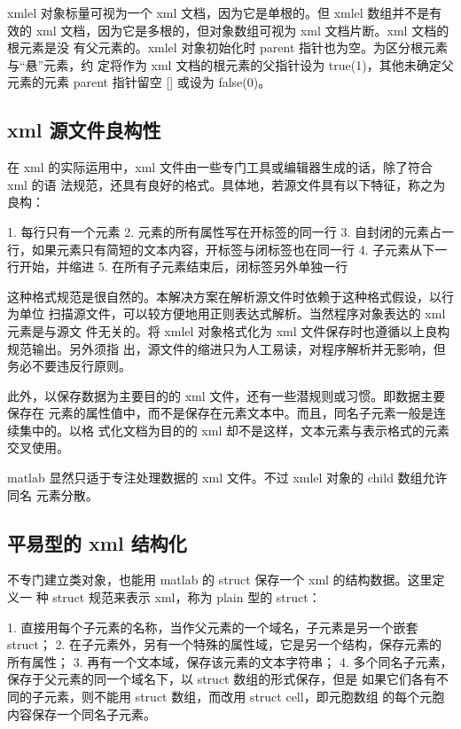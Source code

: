 xmlel 对象标量可视为一个 xml 文档，因为它是单根的。但 xmlel 数组并不是有效的
xml 文档，因为它是多根的，但对象数组可视为 xml 文档片断。xml 文档的根元素是没
有父元素的。xmlel 对象初始化时 parent 指针也为空。为区分根元素与“悬”元素，约
定将作为 xml 文档的根元素的父指针设为 true(1)，其他未确定父元素的元素 parent
指针留空 [] 或设为 false(0)。

\subsection{xml 源文件良构性}

在 xml 的实际运用中，xml 文件由一些专门工具或编辑器生成的话，除了符合 xml 的语
法规范，还具有良好的格式。具体地，若源文件具有以下特征，称之为良构：

1. 每行只有一个元素
2. 元素的所有属性写在开标签的同一行
3. 自封闭的元素占一行，如果元素只有简短的文本内容，开标签与闭标签也在同一行
4. 子元素从下一行开始，并缩进
5. 在所有子元素结束后，闭标签另外单独一行

这种格式规范是很自然的。本解决方案在解析源文件时依赖于这种格式假设，以行为单位
扫描源文件，可以较方便地用正则表达式解析。当然程序对象表达的 xml 元素是与源文
件无关的。将 xmlel 对象格式化为 xml 文件保存时也遵循以上良构规范输出。另外须指
出，源文件的缩进只为人工易读，对程序解析并无影响，但务必不要违反行原则。

此外，以保存数据为主要目的的 xml 文件，还有一些潜规则或习惯。即数据主要保存在
元素的属性值中，而不是保存在元素文本中。而且，同名子元素一般是连续集中的。以格
式化文档为目的的 xml 却不是这样，文本元素与表示格式的元素交叉使用。

matlab 显然只适于专注处理数据的 xml 文件。不过 xmlel 对象的 child 数组允许同名
元素分散。

\subsection{平易型的 xml 结构化}

不专门建立类对象，也能用 matlab 的 struct 保存一个 xml 的结构数据。这里定义一
种 struct 规范来表示 xml，称为 plain 型的 struct：

1. 直接用每个子元素的名称，当作父元素的一个域名，子元素是另一个嵌套 struct；
2. 在子元素外，另有一个特殊的属性域，它是另一个结构，保存元素的所有属性；
3. 再有一个文本域，保存该元素的文本字符串；
4. 多个同名子元素，保存于父元素的同一个域名下，以 struct 数组的形式保存，但是
如果它们各有不同的子元素，则不能用 struct 数组，而改用 struct cell，即元胞数组
的每个元胞内容保存一个同名子元素。

